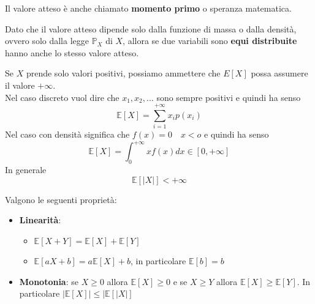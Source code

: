 \begin{note}
	Il valore atteso è anche chiamato \textbf{momento primo} o speranza matematica.
\end{note}

\begin{observation}
	Dato che il valore atteso dipende solo dalla funzione di massa o dalla densità, ovvero solo dalla legge $\mathbb{P}_X$ di $X$, allora se due variabili sono \textbf{equi distribuite} hanno anche lo stesso valore atteso.
\end{observation}

\begin{observation}
	Se $X$ prende solo valori positivi, possiamo ammettere che $E[X]$ possa assumere il valore $+\infty$.\\
	Nel caso discreto vuol dire che $x_1, x_2, \ldots$ sono sempre positivi e quindi ha senso
	\begin{equation*}
		\mathbb{E}[X]=\sum_{i=1}^{+\infty} x_i p(x_i)
	\end{equation*}
	Nel caso con densità significa che $f(x)=0 \quad x<o$ e quindi ha senso
	\begin{equation*}
		\mathbb{E}[X] = \int_{0}^{+\infty} xf(x)dx \in [0, +\infty]
	\end{equation*}
	In generale
	\begin{equation}
		\mathbb{E}[\lvert X \rvert] < + \infty
	\end{equation}
\end{observation}

\begin{proposition}
	Valgono le seguenti proprietà:
	\begin{itemize}
		\item \textbf{Linearità}:
		\begin{itemize}
			\item $\mathbb{E}[X+Y]=\mathbb{E}[X]+\mathbb{E}[Y]$
			\item $\mathbb{E}[aX+b]=a\mathbb{E}[X] + b$, in particolare $\mathbb{E}[b] = b$
		\end{itemize}
		\item \textbf{Monotonia}: se $X \geq 0$ allora $\mathbb{E}[X] \geq 0$ e se $X \geq Y$ allora $\mathbb{E}[X] \geq \mathbb{E}[Y]$. In particolare $\lvert \mathbb{E}[X]\rvert \leq \lvert \mathbb{E}[\lvert X \rvert]$
	\end{itemize}
\end{proposition}

